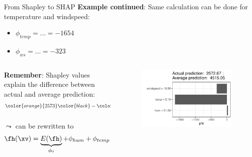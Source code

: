 \documentclass[11pt,compress,t,notes=noshow, aspectratio=169, xcolor=table]{beamer}
\begin{document}
\begin{vbframe}{From Shapley to SHAP}
\textbf{Example continued}: Same calculation can be done for temperature and windspeed:
\begin{itemize}
    \item $\phi_{temp} = \ldots = -1654$
    \item $\phi_{ws} = \ldots = -323$
\end{itemize}

\begin{columns}[T]
\begin{column}{0.5\textwidth}
\textbf{Remember}: Shapley values explain the difference between actual and average prediction:
\begin{eqnarray*}
\color{orange}{2573} \color{black}- \color{blue}{4515} \color{black} = &34 - 1654 - 323 &= - 1942\\
\fh(\xv) - E(\fh) =& \phi_{hum} + \phi_{temp} + \phi_{ws}&\\
\end{eqnarray*}
$\leadsto$ can be rewritten to
$$
\fh(\xv) = \underbrace{E(\fh)}_{\phi_0} + \phi_{hum} + \phi_{temp} + \phi_{ws}
$$
\end{column}
\begin{column}{0.5\textwidth}
\begin{figure}
    \centering
    \includegraphics[width=0.9\columnwidth]{figure/shapley2shap.pdf}
\end{figure}
\end{column}
\end{columns}




\end{vbframe}
\end{document}
